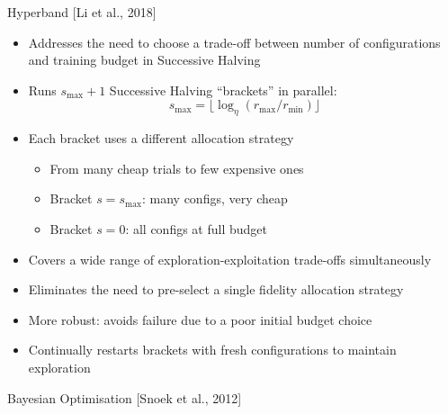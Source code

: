 \documentclass[t,english]{beamer}
\newcommand{\citeref}[1]{{\color{rwth-blue-75}\small[#1]}}
\begin{document}
\begin{frame}{Hyperband \citeref{Li et al., 2018}}
  \begin{itemize}[<+->]
    \item Addresses the need to choose a trade-off between number of configurations and training budget in Successive Halving
    \item Runs $s_{\max}+1$ Successive Halving “brackets” in parallel:
          \[
            s_{\max} = \lfloor \log_\eta (r_{\max} / r_{\min}) \rfloor
          \]
    \item Each bracket uses a different allocation strategy
    \begin{itemize}
    	\item From many cheap trials to few expensive ones
        \item Bracket $s{=}s_{\max}$: many configs, very cheap
        \item Bracket $s{=}0$: all configs at full budget
    \end{itemize}
    \item Covers a wide range of exploration-exploitation trade-offs simultaneously
    \item Eliminates the need to pre-select a single fidelity allocation strategy
    \item More robust: avoids failure due to a poor initial budget choice
    \item Continually restarts brackets with fresh configurations to maintain exploration
  \end{itemize}
\end{frame}

\begin{frame}{Bayesian Optimisation \citeref{Snoek et al., 2012}}
\end{frame}
\end{document}
